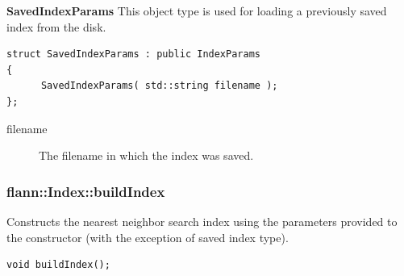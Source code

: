 \documentclass[letter,10pt]{article}
\begin{document}
\begin{description}
\textbf{SavedIndexParams}
This object type is used for loading a previously saved index from the disk.
\begin{Verbatim}[fontsize=\footnotesize]
struct SavedIndexParams : public IndexParams
{
      SavedIndexParams( std::string filename );
};
\end{Verbatim}
\begin{description}
\item[filename]{ The filename in which the index was saved. }
\end{description}
\end{description}

\subsubsection{flann::Index::buildIndex}
Constructs the nearest neighbor search index using the parameters provided to the constructor (with the
exception of saved index type).
\begin{Verbatim}[fontsize=\footnotesize,frame=single]
      void buildIndex();
\end{Verbatim}
\end{document}
